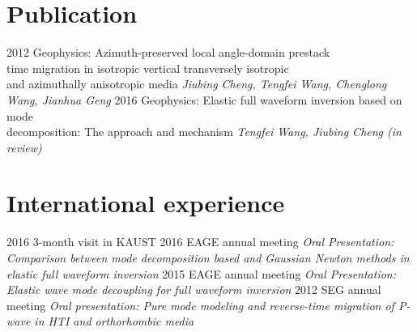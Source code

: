 \documentclass[]{friggeri-encv}
\begin{document}
\section{Publication}
\begin{entrylist}
  \entry
    {2012}
	{Geophysics: Azimuth-preserved local angle-domain prestack \\
	time migration in isotropic	vertical transversely isotropic\\
	and azimuthally anisotropic media}
	{\emph{Jiubing Cheng, Tengfei Wang, Chenglong Wang, Jianhua Geng}}
  \entry
    {2016}
	{Geophysics: Elastic full waveform inversion based on mode\\
		decomposition: The approach and	mechanism
	}
	{\emph{Tengfei Wang, Jiubing Cheng (in review)}}
\end{entrylist}

\section{International experience}
\begin{entrylist}
  \entry
    {2016}
    {3-month visit in KAUST}
	{\emph{
	}}
  \entry
    {2016}
    {EAGE annual meeting}
	{\emph{Oral Presentation: Comparison between mode decomposition based and Gaussian Newton methods in
		elastic full waveform inversion
	}}
  \entry
    {2015}
    {EAGE annual meeting}
	{\emph{Oral Presentation: 
		Elastic wave mode decoupling for full waveform inversion
	}}
  \entry
    {2012}
    {SEG annual meeting}
	{\emph{Oral presentation: Pure mode modeling and reverse-time migration of P-wave in
		HTI and orthorhombic media
	}}
\end{entrylist}
\end{document}
